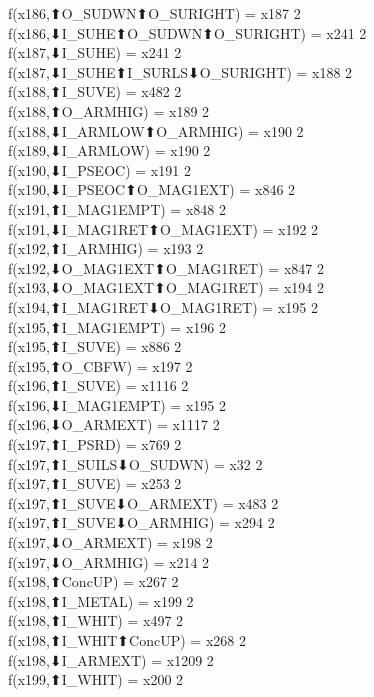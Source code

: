 f(x186,⬆O_SUDWN⬆O_SURIGHT) = x187 {2} \\
f(x186,⬇I_SUHE⬆O_SUDWN⬆O_SURIGHT) = x241 {2} \\
f(x187,⬇I_SUHE) = x241 {2} \\
f(x187,⬇I_SUHE⬆I_SURLS⬇O_SURIGHT) = x188 {2} \\
f(x188,⬆I_SUVE) = x482 {2} \\
f(x188,⬆O_ARMHIG) = x189 {2} \\
f(x188,⬇I_ARMLOW⬆O_ARMHIG) = x190 {2} \\
f(x189,⬇I_ARMLOW) = x190 {2} \\
f(x190,⬇I_PSEOC) = x191 {2} \\
f(x190,⬇I_PSEOC⬆O_MAG1EXT) = x846 {2} \\
f(x191,⬆I_MAG1EMPT) = x848 {2} \\
f(x191,⬇I_MAG1RET⬆O_MAG1EXT) = x192 {2} \\
f(x192,⬆I_ARMHIG) = x193 {2} \\
f(x192,⬇O_MAG1EXT⬆O_MAG1RET) = x847 {2} \\
f(x193,⬇O_MAG1EXT⬆O_MAG1RET) = x194 {2} \\
f(x194,⬆I_MAG1RET⬇O_MAG1RET) = x195 {2} \\
f(x195,⬆I_MAG1EMPT) = x196 {2} \\
f(x195,⬆I_SUVE) = x886 {2} \\
f(x195,⬆O_CBFW) = x197 {2} \\
f(x196,⬆I_SUVE) = x1116 {2} \\
f(x196,⬇I_MAG1EMPT) = x195 {2} \\
f(x196,⬇O_ARMEXT) = x1117 {2} \\
f(x197,⬆I_PSRD) = x769 {2} \\
f(x197,⬆I_SUILS⬇O_SUDWN) = x32 {2} \\
f(x197,⬆I_SUVE) = x253 {2} \\
f(x197,⬆I_SUVE⬇O_ARMEXT) = x483 {2} \\
f(x197,⬆I_SUVE⬇O_ARMHIG) = x294 {2} \\
f(x197,⬇O_ARMEXT) = x198 {2} \\
f(x197,⬇O_ARMHIG) = x214 {2} \\
f(x198,⬆ConcUP) = x267 {2} \\
f(x198,⬆I_METAL) = x199 {2} \\
f(x198,⬆I_WHIT) = x497 {2} \\
f(x198,⬆I_WHIT⬆ConcUP) = x268 {2} \\
f(x198,⬇I_ARMEXT) = x1209 {2} \\
f(x199,⬆I_WHIT) = x200 {2} \\
